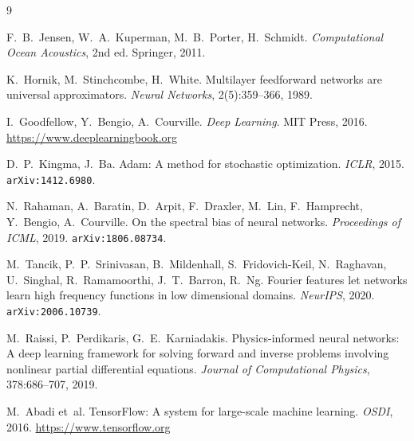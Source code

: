 \documentclass[12pt,a4paper]{article}
\begin{document}
\begin{thebibliography}{9}

  F.~B.~Jensen, W.~A.~Kuperman, M.~B.~Porter, H.~Schmidt.
  \textit{Computational Ocean Acoustics}, 2nd ed.
  Springer, 2011.

  K.~Hornik, M.~Stinchcombe, H.~White.
  Multilayer feedforward networks are universal approximators.
  \textit{Neural Networks}, 2(5):359--366, 1989.

  I.~Goodfellow, Y.~Bengio, A.~Courville.
  \textit{Deep Learning}.
  MIT Press, 2016. \url{https://www.deeplearningbook.org}

  D.~P.~Kingma, J.~Ba.
  Adam: A method for stochastic optimization.
  \textit{ICLR}, 2015. \texttt{arXiv:1412.6980}.

  N.~Rahaman, A.~Baratin, D.~Arpit, F.~Draxler, M.~Lin, F.~Hamprecht,
  Y.~Bengio, A.~Courville.
  On the spectral bias of neural networks.
  \textit{Proceedings of ICML}, 2019. \texttt{arXiv:1806.08734}.

  M.~Tancik, P.~P.~Srinivasan, B.~Mildenhall, S.~Fridovich-Keil,
  N.~Raghavan, U.~Singhal, R.~Ramamoorthi, J.~T.~Barron, R.~Ng.
  Fourier features let networks learn high frequency functions in
  low dimensional domains.
  \textit{NeurIPS}, 2020. \texttt{arXiv:2006.10739}.

  M.~Raissi, P.~Perdikaris, G.~E.~Karniadakis.
  Physics-informed neural networks: A deep learning framework for solving
  forward and inverse problems involving nonlinear partial differential equations.
  \textit{Journal of Computational Physics}, 378:686--707, 2019.

  M.~Abadi et~al.
  TensorFlow: A system for large-scale machine learning.
  \textit{OSDI}, 2016. \url{https://www.tensorflow.org}

\end{thebibliography}
\end{document}
